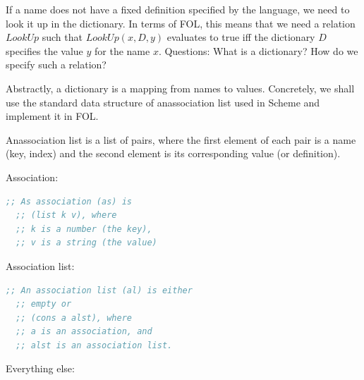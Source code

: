 \documentclass[english, 11pt]{article}
\begin{document}
  If a name does not have a fixed definition specified by the language, we need to look it up in the dictionary. In terms of FOL, this means that we need a relation $LookUp$ such that $LookUp(x,D,y)$  evaluates to true iff the dictionary $D$ specifies the value $y$ for the name $x$. Questions: What is a dictionary? How do we specify such a relation?

  \begin{defn}[dictionary]\label{dictionary}
  Abstractly, a dictionary is a mapping from names to values. Concretely, we shall use the standard data structure of anassociation list used in Scheme and implement it in FOL.
  \end{defn}

  \begin{defn}\label{association list}
  Anassociation list is a list of pairs, where the first element of each pair is a name (key, index) and the second element is its corresponding value (or definition).
  \end{defn}

  Association:
  \begin{lstlisting}[language=lisp]
  ;; As association (as) is
  ;; (list k v), where
  ;; k is a number (the key),
  ;; v is a string (the value)
  \end{lstlisting}
  Association list:
  \begin{lstlisting}[language=lisp]
  ;; An association list (al) is either
  ;; empty or
  ;; (cons a alst), where
  ;; a is an association, and
  ;; alst is an association list.
  \end{lstlisting}

Everything else:


  
\end{document}
